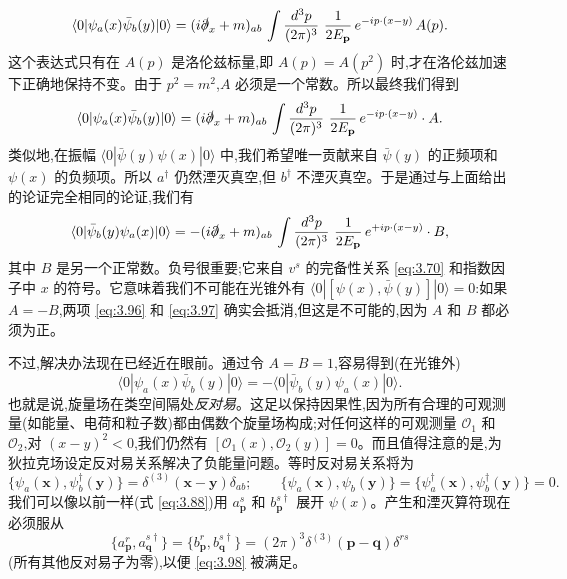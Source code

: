 \begin{equation}
  \langle 0|\psi_a(x)\bar{\psi}_b(y)|0\rangle
    = (i\slashed{\partial}_x + m)_{ab}\,
      \int \frac{d^3p}{(2\pi)^3}\ \frac{1}{2E_{\mathbf{p}}}\,
      e^{-ip\cdot(x-y)}\, A(p) .
  \label{eq:3.95}
\end{equation}
这个表达式只有在 $A(p)$ 是洛伦兹标量,即 $A(p) = A(p^2)$ 时,才在洛伦兹加速下正确地保持不变。由于 $p^2 = m^2$,$A$ 必须是一个常数。所以最终我们得到
\begin{equation}
  \langle 0|\psi_a(x)\bar{\psi}_b(y)|0\rangle
    = (i\slashed{\partial}_x + m)_{ab}\,
      \int \frac{d^3p}{(2\pi)^3}\ \frac{1}{2E_{\mathbf{p}}}\,
      e^{-ip\cdot(x-y)} \cdot A .
  \label{eq:3.96}
\end{equation}
类似地,在振幅 $\langle 0|\bar{\psi}(y)\psi(x)|0\rangle$ 中,我们希望唯一贡献来自 $\bar{\psi}(y)$ 的正频项和 $\psi(x)$ 的负频项。所以 $a^\dagger$ 仍然湮灭真空,但 $b^\dagger$ 不湮灭真空。于是通过与上面给出的论证完全相同的论证,我们有
\begin{equation}
  \langle 0|\bar{\psi}_b(y)\psi_a(x)|0\rangle
    = -(i\slashed{\partial}_x + m)_{ab}\,
      \int \frac{d^3p}{(2\pi)^3}\ \frac{1}{2E_{\mathbf{p}}}\,
      e^{+ip\cdot(x-y)} \cdot B ,
  \label{eq:3.97}
\end{equation}
其中 $B$ 是另一个正常数。负号很重要;它来自 $v^s$ 的完备性关系 \eqref{eq:3.70} 和指数因子中 $x$ 的符号。它意味着我们不可能在光锥外有 $\langle 0|[\psi(x),\bar{\psi}(y)]|0\rangle = 0$:如果 $A = -B$,两项 \eqref{eq:3.96} 和 \eqref{eq:3.97} 确实会抵消,但这是不可能的,因为 $A$ 和 $B$ 都必须为正。

不过,解决办法现在已经近在眼前。通过令 $A = B = 1$,容易得到(在光锥外)
\begin{equation}
  \langle 0|\psi_a(x)\bar{\psi}_b(y)|0\rangle
    = -\langle 0|\bar{\psi}_b(y)\psi_a(x)|0\rangle .
\end{equation}
也就是说,旋量场在类空间隔处\emph{反对易}。这足以保持因果性,因为所有合理的可观测量(如能量、电荷和粒子数)都由偶数个旋量场构成;对任何这样的可观测量 $\mathcal{O}_1$ 和 $\mathcal{O}_2$,对 $(x-y)^2<0$,我们仍然有 $[\mathcal{O}_1(x), \mathcal{O}_2(y)] = 0$。而且值得注意的是,为狄拉克场设定反对易关系解决了负能量问题。等时反对易关系将为
\begin{equation}
  \{\psi_a(\mathbf{x}), \psi_b^\dagger(\mathbf{y})\}
    = \delta^{(3)}(\mathbf{x}-\mathbf{y})\delta_{ab};
  \qquad
  \{\psi_a(\mathbf{x}), \psi_b(\mathbf{y})\}
  = \{\psi_a^\dagger(\mathbf{x}), \psi_b^\dagger(\mathbf{y})\} = 0 .
  \label{eq:3.98}
\end{equation}
我们可以像以前一样(式 \eqref{eq:3.88})用 $a_{\mathbf{p}}^s$ 和 $b_{\mathbf{p}}^{s\dagger}$ 展开 $\psi(x)$。产生和湮灭算符现在必须服从
\begin{equation}
  \{a_{\mathbf{p}}^r, a_{\mathbf{q}}^{s\dagger}\}
  = \{b_{\mathbf{p}}^r, b_{\mathbf{q}}^{s\dagger}\}
    = (2\pi)^3\delta^{(3)}(\mathbf{p}-\mathbf{q})\delta^{rs}
  \label{eq:3.99}
\end{equation}
(所有其他反对易子为零),以便 \eqref{eq:3.98} 被满足。

